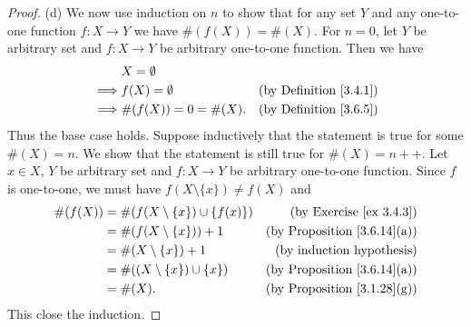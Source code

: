 \begin{proof}{(d)}
    We now use induction on \(n\) to show that for any set \(Y\) and any one-to-one function \(f : X \to Y\) we have \(\#(f(X)) = \#(X)\).
    For \(n = 0\), let \(Y\) be arbitrary set and \(f : X \to Y\) be arbitrary one-to-one function.
    Then we have
    \begin{align*}
                 & X = \emptyset                                              \\
        \implies & f(X) = \emptyset      & \text{(by Definition \ref{3.4.1})} \\
        \implies & \#(f(X)) = 0 = \#(X). & \text{(by Definition \ref{3.6.5})}
    \end{align*}
    Thus the base case holds.
    Suppose inductively that the statement is true for some \(\#(X) = n\).
    We show that the statement is still true for \(\#(X) = n++\).
    Let \(x \in X\), \(Y\) be arbitrary set and \(f : X \to Y\) be arbitrary one-to-one function.
    Since \(f\) is one-to-one, we must have \(f(X \setminus \{x\}) \neq f(X)\) and
    \begin{align*}
        \#(f(X)) & = \#(f(X \setminus \{x\}) \cup \{f(x)\}) & \text{(by Exercise \ref{ex 3.4.3})}     \\
                 & = \#(f(X \setminus \{x\})) + 1           & \text{(by Proposition \ref{3.6.14}(a))} \\
                 & = \#(X \setminus \{x\}) + 1              & \text{(by induction hypothesis)}        \\
                 & = \#((X \setminus \{x\}) \cup \{x\})     & \text{(by Proposition \ref{3.6.14}(a))} \\
                 & = \#(X).                                 & \text{(by Proposition \ref{3.1.28}(g))}
    \end{align*}
    This close the induction.
\end{proof}

